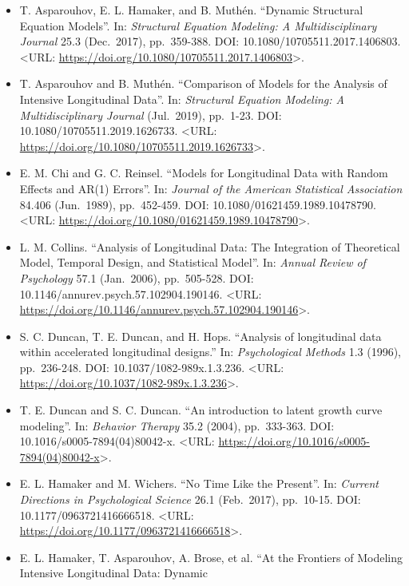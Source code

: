 \documentclass[]{book}
\begin{document}
\begin{itemize}
\item
  T. Asparouhov, E. L. Hamaker, and B. Muthén. ``Dynamic Structural Equation Models''. In: \emph{Structural Equation Modeling:
  A Multidisciplinary Journal} 25.3 (Dec.~2017), pp.~359-388. DOI: 10.1080/10705511.2017.1406803. \textless{}URL:
  \url{https://doi.org/10.1080/10705511.2017.1406803}\textgreater{}.
\item
  T. Asparouhov and B. Muthén. ``Comparison of Models for the Analysis of Intensive Longitudinal Data''. In: \emph{Structural
  Equation Modeling: A Multidisciplinary Journal} (Jul.~2019), pp.~1-23. DOI: 10.1080/10705511.2019.1626733. \textless{}URL:
  \url{https://doi.org/10.1080/10705511.2019.1626733}\textgreater{}.
\item
  E. M. Chi and G. C. Reinsel. ``Models for Longitudinal Data with Random Effects and AR(1) Errors''. In: \emph{Journal of the
  American Statistical Association} 84.406 (Jun.~1989), pp.~452-459. DOI: 10.1080/01621459.1989.10478790. \textless{}URL:
  \url{https://doi.org/10.1080/01621459.1989.10478790}\textgreater{}.
\item
  L. M. Collins. ``Analysis of Longitudinal Data: The Integration of Theoretical Model, Temporal Design, and Statistical
  Model''. In: \emph{Annual Review of Psychology} 57.1 (Jan.~2006), pp.~505-528. DOI: 10.1146/annurev.psych.57.102904.190146.
  \textless{}URL: \url{https://doi.org/10.1146/annurev.psych.57.102904.190146}\textgreater{}.
\item
  S. C. Duncan, T. E. Duncan, and H. Hops. ``Analysis of longitudinal data within accelerated longitudinal designs.'' In:
  \emph{Psychological Methods} 1.3 (1996), pp.~236-248. DOI: 10.1037/1082-989x.1.3.236. \textless{}URL:
  \url{https://doi.org/10.1037/1082-989x.1.3.236}\textgreater{}.
\item
  T. E. Duncan and S. C. Duncan. ``An introduction to latent growth curve modeling''. In: \emph{Behavior Therapy} 35.2 (2004),
  pp.~333-363. DOI: 10.1016/s0005-7894(04)80042-x. \textless{}URL: \url{https://doi.org/10.1016/s0005-7894(04)80042-x}\textgreater{}.
\item
  E. L. Hamaker and M. Wichers. ``No Time Like the Present''. In: \emph{Current Directions in Psychological Science} 26.1
  (Feb.~2017), pp.~10-15. DOI: 10.1177/0963721416666518. \textless{}URL: \url{https://doi.org/10.1177/0963721416666518}\textgreater{}.
\item
  E. L. Hamaker, T. Asparouhov, A. Brose, et al. ``At the Frontiers of Modeling Intensive Longitudinal Data: Dynamic

\end{itemize}
\end{document}
